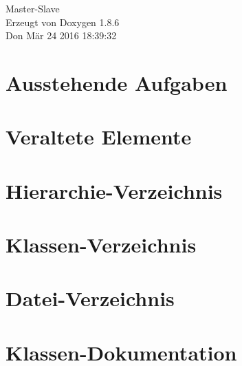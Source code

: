 \documentclass[twoside]{book}
\newcommand{\clearemptydoublepage}{%
  \newpage{\pagestyle{empty}\cleardoublepage}%
}
\begin{document}
\hypersetup{pageanchor=false}
\begin{titlepage}
\vspace*{7cm}
\begin{center}%
{\Large Master-\/\-Slave }\\
\vspace*{1cm}
{\large Erzeugt von Doxygen 1.8.6}\\
\vspace*{0.5cm}
{\small Don Mär 24 2016 18:39:32}\\
\end{center}
\end{titlepage}
\clearemptydoublepage
\tableofcontents
\clearemptydoublepage
{}
\hypersetup{pageanchor=true}

\chapter{Ausstehende Aufgaben}
\label{todo}
\hypertarget{todo}{}

\chapter{Veraltete Elemente}
\label{deprecated}
\hypertarget{deprecated}{}

\chapter{Hierarchie-\/\-Verzeichnis}

\chapter{Klassen-\/\-Verzeichnis}

\chapter{Datei-\/\-Verzeichnis}

\chapter{Klassen-\/\-Dokumentation}





















\end{document}

